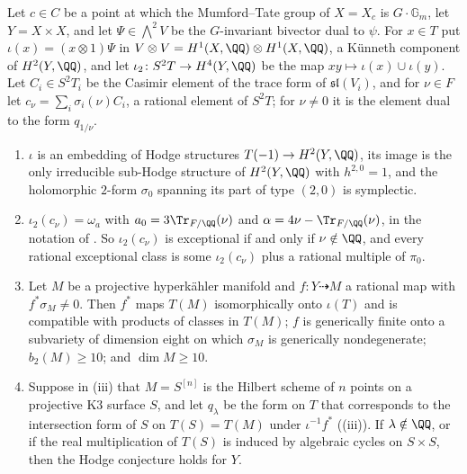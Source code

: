 \begin{proposition}\label{prop:hksquare}
Let $c\in C$ be a point at which the Mumford--Tate group of $X=X_{c}$ is
$G\cdot\mathbb{G}_{m}$, let $Y=X\times X$, and let $\Psi\in\bigwedge^{2}V$ be
the $G$-invariant bivector dual to $\psi$. For $x\in T$ put
$\iota(x)=(x\otimes1)\Psi$ in $V\otimes V=H^{1}(X,\QQ)\otimes H^{1}(X,\QQ)$, a
K\"unneth component of $H^{2}(Y,\QQ)$, and let $\iota_{2}\colon S^{2}T\to
H^{4}(Y,\QQ)$ be the map $xy\mapsto\iota(x)\cup\iota(y)$. Let $C_{i}\in
S^{2}T_{i}$ be the Casimir element of the trace form of
$\mathfrak{sl}(V_{i})$, and for $\nu\in F$ let
$c_{\nu}=\sum_{i}\sigma_{i}(\nu)C_{i}$, a rational element of $S^{2}T$; for
$\nu\ne0$ it is the element dual to the form $q_{1/\nu}$.
\begin{enumerate}[label=\textup{(\roman*)},leftmargin=2.6em,itemsep=2pt]
\item $\iota$ is an embedding of Hodge structures $T(-1)\to H^{2}(Y,\QQ)$, its
  image is the only irreducible sub-Hodge structure of $H^{2}(Y,\QQ)$ with
  $h^{2,0}=1$, and the holomorphic $2$-form $\sigma_{0}$ spanning its part of
  type $(2,0)$ is symplectic.
\item $\iota_{2}(c_{\nu})=\omega_{a}$ with $a_{0}=3\Tr_{F/\QQ}(\nu)$ and
  $\alpha=4\nu-\Tr_{F/\QQ}(\nu)$, in the notation of . So
  $\iota_{2}(c_{\nu})$ is exceptional if and only if $\nu\notin\QQ$, and every
  rational exceptional class is some $\iota_{2}(c_{\nu})$ plus a rational
  multiple of $\pi_{0}$.
\item Let $M$ be a projective hyperk\"ahler manifold and
  $f\colon Y\dashrightarrow M$ a rational map with $f^{*}\sigma_{M}\ne0$. Then
  $f^{*}$ maps $T(M)$ isomorphically onto $\iota(T)$ and is compatible with
  products of classes in $T(M)$; $f$ is generically finite onto a subvariety
  of dimension eight on which $\sigma_{M}$ is generically nondegenerate;
  $b_{2}(M)\ge10$; and $\dim M\ge10$.
\item Suppose in (iii) that $M=S^{[n]}$ is the Hilbert scheme of $n$ points
  on a projective K3 surface $S$, and
  let $q_{\lambda}$ be the form on $T$ that corresponds to the intersection
  form of $S$ on $T(S)=T(M)$ under $\iota^{-1}f^{*}$
  ((iii)). If $\lambda\notin\QQ$, or if the real
  multiplication of $T(S)$ is induced by algebraic cycles on $S\times S$,
  then the Hodge conjecture holds for $Y$.
\end{enumerate}
\end{proposition}

